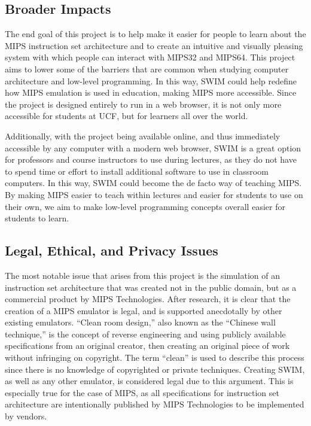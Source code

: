 \documentclass[
    paper=letter,
    parskip=half,
    fontsize=12pt,
    titlepage=firstiscover,
    toc=bibliography,
    numbers=endperiod
]{scrartcl}
\begin{document}
\subsection{Broader Impacts}
The end goal of this project is to help make it easier for people to
learn about the MIPS instruction set architecture and to create an
intuitive and visually pleasing system with which people can interact
with MIPS32 and MIPS64. This project aims to lower some of the barriers
that are common when studying computer architecture and low-level
programming. In this way, SWIM could help redefine how MIPS emulation is
used in education, making MIPS more accessible. Since the project is
designed entirely to run in a web browser, it is not only more
accessible for students at UCF, but for learners all over the world.

Additionally, with the project being available online, and thus
immediately accessible by any computer with a modern web browser, SWIM
is a great option for professors and course instructors to use during
lectures, as they do not have to spend time or effort to install
additional software to use in classroom computers. In this way, SWIM
could become the de facto way of teaching MIPS. By making MIPS easier to
teach within lectures and easier for students to use on their own, we
aim to make low-level programming concepts overall easier for students
to learn.

\subsection{Legal, Ethical, and Privacy Issues}
The most notable issue that arises from this project is the simulation
of an instruction set architecture that was created not in the public
domain, but as a commercial product by MIPS Technologies. After
research, it is clear that the creation of a MIPS emulator is legal, and
is supported anecdotally by other existing emulators. ``Clean room
design,'' also known as the ``Chinese wall technique,'' is the concept
of reverse engineering and using publicly available specifications from
an original creator, then creating an original piece of work without
infringing on copyright. The term ``clean'' is used to describe this
process since there is no knowledge of copyrighted or private
techniques. Creating SWIM, as well as any other emulator, is considered
legal due to this argument. This is especially true for the case of
MIPS, as all specifications for instruction set architecture are
intentionally published by MIPS Technologies to be implemented by
vendors.
\end{document}
